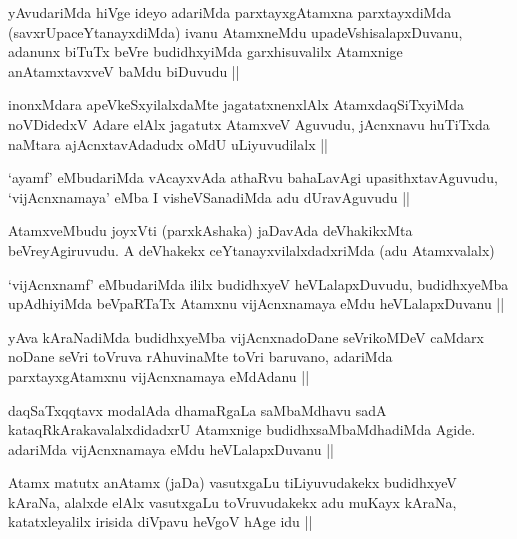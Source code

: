 \begin{artha}
yAvudariMda hiVge ideyo adariMda parxtayxgAtamxna parxtayxdiMda (savxrUpaceYtanayxdiMda) ivanu AtamxneMdu upadeVshisalapxDuvanu, adanunx biTuTx beVre budidhxyiMda garxhisuvalilx Atamxnige anAtamxtavxveV baMdu biDuvudu ||
\end{artha}

\begin{artha}
inonxMdara apeVkeSxyilalxdaMte jagatatxnenxlAlx AtamxdaqSiTxyiMda noVDidedxV Adare elAlx jagatutx AtamxveV Aguvudu, jAcnxnavu huTiTxda naMtara ajAcnxtavAdadudx oMdU uLiyuvudilalx ||
\end{artha}

\begin{artha}
`ayamf' eMbudariMda vAcayxvAda athaRvu bahaLavAgi upasithxtavAguvudu, `vijAcnxnamaya' eMba I visheVSanadiMda adu dUravAguvudu ||
\end{artha}

\begin{artha}
AtamxveMbudu joyxVti (parxkAshaka) jaDavAda deVhakikxMta beVreyAgiruvudu. A deVhakekx ceYtanayxvilalxdadxriMda (adu Atamxvalalx)
\end{artha}

\begin{artha}
`vijAcnxnamf' eMbudariMda ililx budidhxyeV heVLalapxDuvudu, budidhxyeMba upAdhiyiMda beVpaRTaTx Atamxnu vijAcnxnamaya eMdu heVLalapxDuvanu ||
\end{artha}

\begin{artha}
yAva kAraNadiMda budidhxyeMba vijAcnxnadoDane seVrikoMDeV caMdarx noDane seVri toVruva rAhuvinaMte toVri baruvano, adariMda parxtayxgAtamxnu vijAcnxnamaya eMdAdanu ||
\end{artha}

\begin{artha}
daqSaTxqqtavx modalAda dhamaRgaLa saMbaMdhavu sadA kataqRkArakavalalxdidadxrU Atamxnige budidhxsaMbaMdhadiMda Agide. adariMda vijAcnxnamaya eMdu heVLalapxDuvanu ||
\end{artha}

\begin{artha}
Atamx matutx anAtamx (jaDa) vasutxgaLu tiLiyuvudakekx budidhxyeV kAraNa, alalxde elAlx vasutxgaLu toVruvudakekx adu muKayx kAraNa, katatxleyalilx irisida diVpavu heVgoV hAge idu ||
\end{artha}

